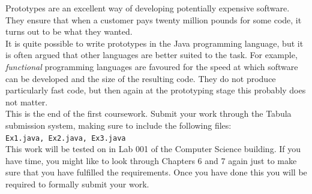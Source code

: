 \noindent
Prototypes are an excellent way of developing potentially expensive software.
They ensure that when a customer pays twenty million pounds for some code,
it turns out to be what they wanted.\\

\noindent
It is quite possible to write prototypes in the Java programming language,
but it is often argued that other languages are better suited to the task. For example, 
{\it functional} programming languages are favoured for the speed at which 
software can be developed and the size of the resulting code. They do not 
produce particularly fast code, but then again at the prototyping stage this 
probably does not matter. \\

\noindent
This is the end of the first coursework. Submit your work through the Tabula
submission system, making sure to include the following files:\\

\noindent
{\tt Ex1.java, Ex2.java, Ex3.java} \\

\noindent
This work will be tested on 
\deadlineone in Lab 001 of the Computer Science
building. If you have time, you might like to look through Chapters 6 and 
7 again just to make sure that you have fulfilled the requirements. Once 
you have done this you will be required to formally submit your work.